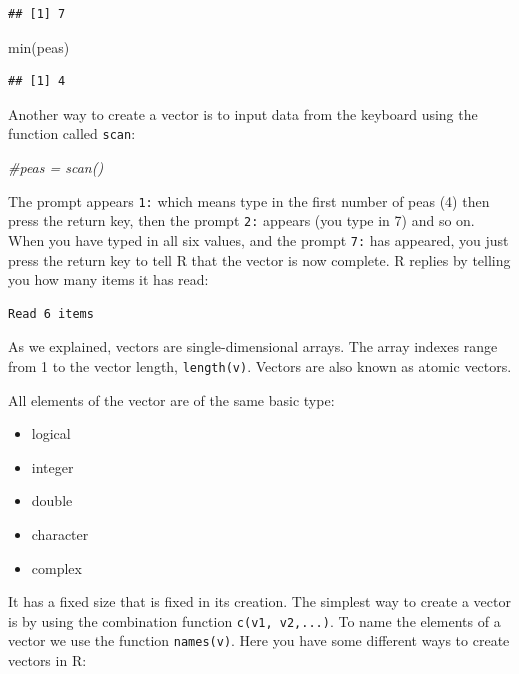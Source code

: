 \documentclass[
]{book}
\newenvironment{Shaded}{\begin{snugshade}}{\end{snugshade}}
\newcommand{\CommentTok}[1]{\textcolor[rgb]{0.56,0.35,0.01}{\textit{#1}}}
\newcommand{\FunctionTok}[1]{\textcolor[rgb]{0.00,0.00,0.00}{#1}}
\newcommand{\NormalTok}[1]{#1}
\providecommand{\tightlist}{%
  \setlength{\itemsep}{0pt}\setlength{\parskip}{0pt}}
\begin{document}
\begin{verbatim}
## [1] 7
\end{verbatim}

\begin{Shaded}
\begin{Highlighting}[]
\FunctionTok{min}\NormalTok{(peas)}
\end{Highlighting}
\end{Shaded}

\begin{verbatim}
## [1] 4
\end{verbatim}

Another way to create a vector is to input data from the keyboard using the function called \texttt{scan}:

\begin{Shaded}
\begin{Highlighting}[]
\CommentTok{\#peas = scan()}
\end{Highlighting}
\end{Shaded}

The prompt appears \texttt{1:} which means type in the first number of peas (4) then press the return key, then the prompt \texttt{2:} appears (you type in 7) and so on. When you have typed in all six values, and the prompt \texttt{7:} has appeared, you just press the return key to tell R that the vector is now complete. R replies by telling you how many items it has read:

\begin{verbatim}
Read 6 items
\end{verbatim}

As we explained, vectors are single-dimensional arrays. The array indexes range from 1 to the vector length, \texttt{length(v)}. Vectors are also known as atomic vectors.

All elements of the vector are of the same basic type:

\begin{itemize}
\tightlist
\item
  logical
\item
  integer
\item
  double
\item
  character
\item
  complex
\end{itemize}

It has a fixed size that is fixed in its creation. The simplest way to create a vector is by using the combination function \texttt{c(v1,\ v2,...)}. To name the elements of a vector we use the function \texttt{names(v)}. Here you have some different ways to create vectors in R:
\end{document}
